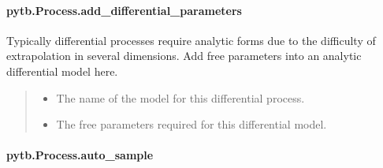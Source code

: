 \documentclass[letterpaper,10pt,english,openany,oneside]{sphinxmanual}
\begin{document}
\begin{fulllineitems}
\sphinxstepscope


\paragraph{pytb.Process.add\_differential\_parameters}
\label{\detokenize{api/pytb.Process.add_differential_parameters:pytb-process-add-differential-parameters}}\label{\detokenize{api/pytb.Process.add_differential_parameters::doc}}

\begin{fulllineitems}
\label{\detokenize{api/pytb.Process.add_differential_parameters:pytb.Process.add_differential_parameters}}
\pysigstartsignatures
{}
\pysigstopsignatures
\sphinxAtStartPar
Typically differential processes require analytic forms
due to the difficulty of extrapolation in several dimensions.
Add free parameters into an analytic differential model here.
\begin{quote}\begin{description}
\begin{itemize}
\item {} 
\sphinxAtStartPar
{} \textendash{} The name of the model for this differential process.

\item {} 
\sphinxAtStartPar
{} \textendash{} The free parameters required for this differential model.

\end{itemize}

\end{description}\end{quote}

\end{fulllineitems}


\sphinxstepscope


\paragraph{pytb.Process.auto\_sample}
\label{\detokenize{api/pytb.Process.auto_sample:pytb-process-auto-sample}}\label{\detokenize{api/pytb.Process.auto_sample::doc}}


\end{fulllineitems}
\end{document}
